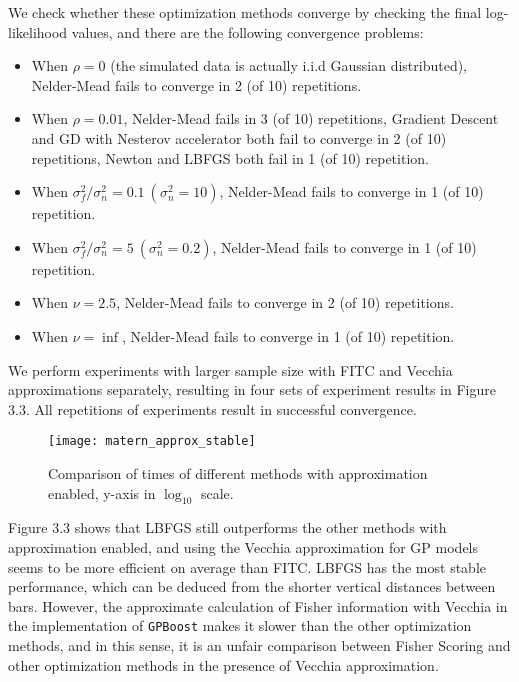 We check whether these optimization methods converge by checking the final log-likelihood values, and there are the following convergence problems:

\begin{itemize}
\item When $\rho=0$ (the simulated data is actually i.i.d Gaussian distributed), Nelder-Mead fails to converge in 2 (of 10) repetitions. 
\item When $\rho = 0.01$, Nelder-Mead fails in 3 (of 10) repetitions, Gradient Descent and GD with Nesterov accelerator both fail to converge in 2 (of 10) repetitions, Newton and LBFGS both fail in 1 (of 10) repetition.
\item When $\sigma^2_f/\sigma^2_n=0.1 \ (\sigma^2_n=10)$, Nelder-Mead fails to converge in 1 (of 10) repetition.
\item When $\sigma^2_f/\sigma^2_n=5 \ (\sigma^2_n=0.2)$, Nelder-Mead fails to converge in 1 (of 10) repetition.
\item When $\nu = 2.5$, Nelder-Mead fails to converge in 2 (of 10) repetitions.
\item When $\nu = \inf $, Nelder-Mead fails to converge in 1 (of 10) repetition.
\end{itemize}

We perform experiments with larger sample size with FITC and Vecchia approximations separately, resulting in four sets of experiment results in Figure 3.3. All repetitions of experiments result in successful convergence.

\begin{figure}[hbt!]%
  \centering
  \texttt{[image: matern\_approx\_stable]} %
  \caption[Times of simulated GP-Matern using approximation: line graphs with range bars]%
  {Comparison of times of different methods with approximation enabled, y-axis in $\log_{10}$ scale.}%
  \label{fig:matern_iteration}
\end{figure}

Figure 3.3 shows that LBFGS still outperforms the other methods with approximation enabled, and using the Vecchia approximation for GP models seems to be more efficient on average than FITC. LBFGS has the most stable performance, which can be deduced from the shorter vertical distances between bars. However, the approximate calculation of Fisher information with Vecchia in the implementation of \texttt{GPBoost} makes it slower than the other optimization methods, and in this sense, it is an unfair comparison between Fisher Scoring and other optimization methods in the presence of Vecchia approximation.

